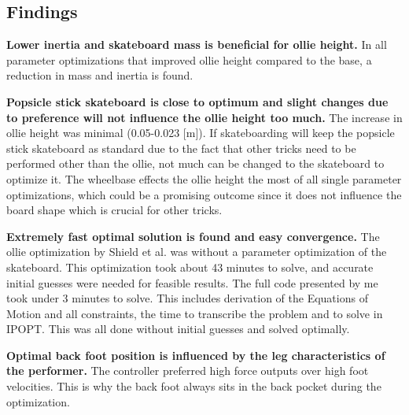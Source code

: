 \documentclass[default,iicol]{sn-jnl}
\begin{document}
{\subsection{Findings}
\noindent\textbf{Lower inertia and skateboard mass is beneficial for ollie height.} In all parameter optimizations that improved ollie height compared to the base, a reduction in mass and inertia is found.

\noindent\textbf{Popsicle stick skateboard is close to optimum and slight changes due to preference will not influence the ollie height too much.} The increase in ollie height was minimal (0.05-0.023 [m]). If skateboarding will keep the popsicle stick skateboard as standard due to the fact that other tricks need to be performed other than the ollie, not much can be changed to the skateboard to optimize it. The wheelbase effects the ollie height the most of all single parameter optimizations, which could be a promising outcome since it does not influence the board shape which is crucial for other tricks. 

\noindent\textbf{Extremely fast optimal solution is found and easy convergence.} The ollie optimization by Shield et al. \cite{shield_contact-implicit_2022} was without a parameter optimization of the skateboard. This optimization took about 43 minutes to solve, and accurate initial guesses were needed for feasible results. The full code presented by me took under 3 minutes to solve. This includes derivation of the Equations of Motion and all constraints, the time to transcribe the problem and to solve in IPOPT. This was all done without initial guesses and solved optimally.

\noindent\textbf{Optimal back foot position is influenced by the leg characteristics of the performer.} The controller preferred high force outputs over high foot velocities. This is why the back foot always sits in the back pocket during the optimization.

}
\end{document}
